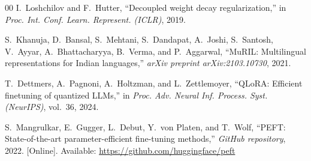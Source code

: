 \documentclass[conference]{IEEEtran}
\begin{document}
\begin{thebibliography}{00}
I.~Loshchilov and F.~Hutter, ``Decoupled weight decay regularization,'' in \emph{Proc. Int. Conf. Learn. Represent. (ICLR)}, 2019.

S.~Khanuja, D.~Bansal, S.~Mehtani, S.~Dandapat, A.~Joshi, S.~Santosh, V.~Ayyar, A.~Bhattacharyya, B.~Verma, and P.~Aggarwal, ``MuRIL: Multilingual representations for Indian languages,'' \emph{arXiv preprint arXiv:2103.10730}, 2021.

T.~Dettmers, A.~Pagnoni, A.~Holtzman, and L.~Zettlemoyer, ``QLoRA: Efficient finetuning of quantized LLMs,'' in \emph{Proc. Adv. Neural Inf. Process. Syst. (NeurIPS)}, vol.~36, 2024.

S.~Mangrulkar, E.~Gugger, L.~Debut, Y.~von Platen, and T.~Wolf, ``PEFT: State-of-the-art parameter-efficient fine-tuning methods,'' \emph{GitHub repository}, 2022. [Online]. Available: \url{https://github.com/huggingface/peft}

\end{thebibliography}
\end{document}
